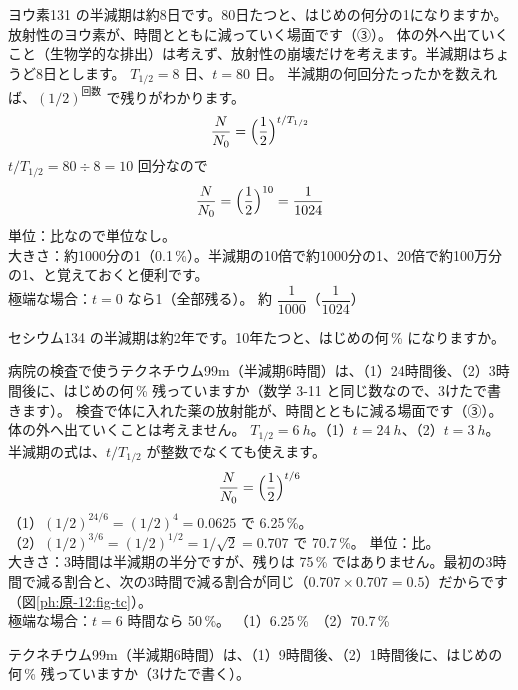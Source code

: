 \label{ph:原-12:ex2}
\begin{phreidai}
ヨウ素131 の半減期は約8日です。80日たつと、はじめの何分の1になりますか。
\phbamen
放射性のヨウ素が、時間とともに減っていく場面です（③）。
\phmushi
体の外へ出ていくこと（生物学的な排出）は考えず、放射性の崩壊だけを考えます。半減期はちょうど8日とします。
\phzu
$T_{1/2}=8$ 日、$t=80$ 日。
\phriyu
半減期の何回分たったかを数えれば、$(1/2)^{\text{回数}}$ で残りがわかります。
\phtateru
\[ \frac{N}{N_0}=\Bigl(\frac12\Bigr)^{t/T_{1/2}} \]
\phtoku
$t/T_{1/2}=80\div8=10$ 回分なので
\[ \frac{N}{N_0}=\Bigl(\frac12\Bigr)^{10}=\frac1{1024} \]
\phtashikame
単位：比なので単位なし。\\
大きさ：約1000分の1（0.1\,\%）。半減期の10倍で約1000分の1、20倍で約100万分の1、と覚えておくと便利です。\\
極端な場合：$t=0$ なら1（全部残る）。
\kotae 約 $\dfrac{1}{1000}$（$\dfrac1{1024}$）
\end{phreidai}
\begin{jibun}
セシウム134 の半減期は約2年です。10年たつと、はじめの何\,\% になりますか。
\end{jibun}

\label{ph:原-12:ex3}
\begin{phreidai}
病院の検査で使うテクネチウム99m（半減期6時間）は、（1）24時間後、（2）3時間後に、はじめの何\,\% 残っていますか（数学 3-11 と同じ数なので、3けたで書きます）。
\phbamen
検査で体に入れた薬の放射能が、時間とともに減る場面です（③）。
\phmushi
体の外へ出ていくことは考えません。
\phzu
$T_{1/2}=\qty{6}{h}$。（1）$t=\qty{24}{h}$、（2）$t=\qty{3}{h}$。
\phriyu
半減期の式は、$t/T_{1/2}$ が整数でなくても使えます。
\phtateru
\[ \frac{N}{N_0}=\Bigl(\frac12\Bigr)^{t/6} \]
\phtoku
（1）$(1/2)^{24/6}=(1/2)^4=0.0625$ で 6.25\,\%。\\
（2）$(1/2)^{3/6}=(1/2)^{1/2}=1/\sqrt2=0.707$ で 70.7\,\%。
\phtashikame
単位：比。\\
大きさ：3時間は半減期の半分ですが、残りは 75\,\% ではありません。最初の3時間で減る割合と、次の3時間で減る割合が同じ（$0.707\times0.707=0.5$）だからです（図\ref{ph:原-12:fig-tc}）。\\
極端な場合：$t=6$ 時間なら 50\,\%。
\kotae （1）6.25\,\%　（2）70.7\,\%
\end{phreidai}
\begin{jibun}
テクネチウム99m（半減期6時間）は、（1）9時間後、（2）1時間後に、はじめの何\,\% 残っていますか（3けたで書く）。
\end{jibun}

